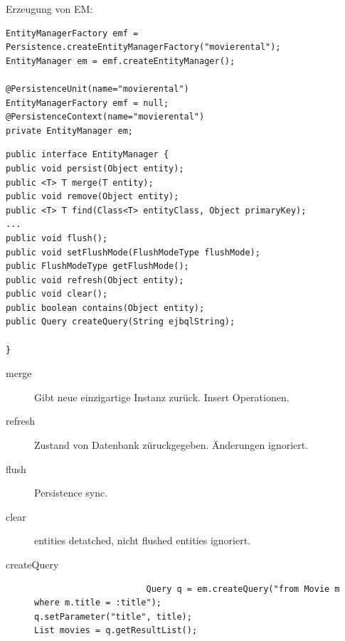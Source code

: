 \documentclass[a4paper,10pt]{scrreprt}
\begin{document}
Erzeugung von EM:
\begin{lstlisting}[caption=Erzeugung von EM]
 EntityManagerFactory emf =
Persistence.createEntityManagerFactory("movierental");
EntityManager em = emf.createEntityManager();

@PersistenceUnit(name="movierental")
EntityManagerFactory emf = null;
@PersistenceContext(name="movierental")
private EntityManager em;

\end{lstlisting}

\begin{lstlisting}[caption=Entity Manager JPA]
 public interface EntityManager {
public void persist(Object entity);
public <T> T merge(T entity);
public void remove(Object entity);
public <T> T find(Class<T> entityClass, Object primaryKey);
...
public void flush();
public void setFlushMode(FlushModeType flushMode);
public FlushModeType getFlushMode();
public void refresh(Object entity);
public void clear();
public boolean contains(Object entity);
public Query createQuery(String ejbqlString);

}
\end{lstlisting}

\begin{description}
 \item[merge] Gibt neue einzigartige Instanz zurück. Insert Operationen.
 \item[refresh] Zustand von Datenbank züruckgegeben. Änderungen ignoriert.
 \item [flush] Persistence sync. 
 \item [clear] entities detatched, nicht flushed entities ignoriert.
 \item [createQuery] \begin{verbatim}
                      Query q = em.createQuery("from Movie m where m.title = :title");
q.setParameter("title", title);
List movies = q.getResultList();
                     \end{verbatim}

\end{description}
\end{document}

